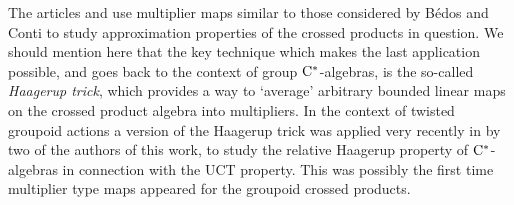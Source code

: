 \documentclass[11 pt, leqno]{amsart}
\numberwithin{equation}{section}
\theoremstyle{plain}
\theoremstyle{definition}
\newcommand{\cst}{\ifmmode\mathrm{C}^*\else{$\mathrm{C}^*$}\fi}
\begin{document}
The articles \cite{dong_ruan} and \cite{mstt} use multiplier maps similar to those considered by B\'edos and Conti to study approximation properties of the crossed products in question. 
We should mention here that the key technique which makes the last application possible, and goes back to the context of group $\cst$-algebras, is the so-called \emph{Haagerup trick}, which provides a way to `average' arbitrary bounded linear maps on  the crossed product algebra into multipliers. 
In the context of twisted groupoid actions a version of the Haagerup trick was applied very recently in \cite{BartoszKangAdam} by two of the authors of this work, to study the relative Haagerup property of $\cst$-algebras in connection with the UCT property. 
This was possibly the first time multiplier type maps appeared for the groupoid crossed products. 
\end{document}
